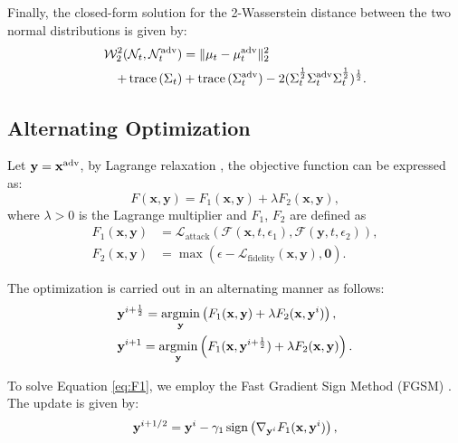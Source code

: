 Finally, the closed-form solution for the 2-Wasserstein distance between the two normal distributions is given by:
\begin{equation}
\begin{aligned}
    \mathcal{W}_2^2(\mathcal{N}_t, \mathcal{N}_t^{\adv})
    &=\|\mu_t-\mu_t^{\adv}\|_2^2 \\
    + \trac{(\Sigma_t)} &+ \trac{(\Sigma_t^{\adv})}
    -2(\Sigma_t^{\frac{1}{2}}\Sigma_t^{\adv}\Sigma_t^{\frac{1}{2}})^\frac{1}{2}.
\end{aligned}
\end{equation}


\subsection{Alternating Optimization}
Let $\mathbf{y} = \mathbf{x}^{\adv}$, by Lagrange relaxation \cite{liu2023instruct2attack}, the objective function can be expressed as:    
\begin{equation}
F(\mathbf{x}, \mathbf{y}) = F_1(\mathbf{x}, \mathbf{y}) + \lambda F_2(\mathbf{x}, \mathbf{y}),
\end{equation}
where $\lambda > 0$ is the Lagrange multiplier and $F_1$, $F_2$ are defined as
\begin{align}
    F_1(\mathbf{x}, \mathbf{y})
    &=\mathcal{L}_\text{attack}(
    \mathcal{F}(\mathbf{x}, t, \epsilon_1), \mathcal{F}(\mathbf{y}, t, \epsilon_2)), \\
    F_2(\mathbf{x}, \mathbf{y})
    &=\max (\epsilon-\mathcal{L}_\text{fidelity}(\mathbf{x}, \mathbf{y}), \mathbf{0}).
\end{align}

The optimization is carried out in an alternating manner as follows:
\begin{align}
    & \mathbf{y}^{i+\frac{1}{2}} = \argmin_{\mathbf{y}} \left(F_1(\mathbf{x}, \mathbf{y}) + \lambda F_2(\mathbf{x}, \mathbf{y}^{i})\right), \label{eq:F1} \\
    & \mathbf{y}^{i+1} = \argmin_{\mathbf{y}} \left(F_1(\mathbf{x}, \mathbf{y}^{i+\frac{1}{2}}) + \lambda F_2(\mathbf{x}, \mathbf{y})\right). \label{eq:F2}
\end{align}

To solve Equation \ref{eq:F1}, we employ the Fast Gradient Sign Method (FGSM) \cite{ian2015fgsm}. The update is given by:
\begin{equation}
\mathbf{y}^{i+1/2} = \mathbf{y}^{i} - \gamma_1 \sign\left(\nabla_{\mathbf{y}^i} F_1(\mathbf{x}, \mathbf{y}^i)\right),
\end{equation}

